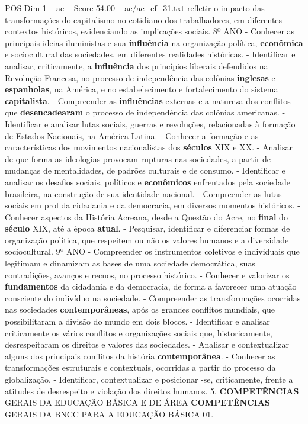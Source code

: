 \begin{textsample}{POS Dim 1 – ac – Score 54.00 – ac/ac\_ef\_31.txt}
refletir o impacto das transformações do capitalismo no cotidiano dos trabalhadores, em diferentes contextos históricos, evidenciando as implicações sociais. 8º ANO - Conhecer as principais ideias iluministas e sua \textbf{influência} na organização política, \textbf{econômica} e sociocultural das sociedades, em diferentes realidades históricas. - Identificar e analisar, criticamente, a \textbf{influência} dos princípios liberais defendidos na Revolução Francesa, no processo de independência das colônias \textbf{inglesas} e \textbf{espanholas}, na América, e no estabelecimento e fortalecimento do sistema \textbf{capitalista}. - Compreender as \textbf{influências} externas e a natureza dos conflitos que \textbf{desencadearam} o processo de independência das colônias americanas. - Identificar e analisar lutas sociais, guerras e revoluções, relacionadas à formação de Estados Nacionais, na América Latina. - Conhecer a formação e as características dos movimentos nacionalistas dos \textbf{séculos} XIX e XX. - Analisar de que forma as ideologias provocam rupturas nas sociedades, a partir de mudanças de mentalidades, de padrões culturais e de consumo. - Identificar e analisar os desafios sociais, políticos e \textbf{econômicos} enfrentados pela sociedade brasileira, na construção de sua identidade nacional. - Compreender as lutas sociais em prol da cidadania e da democracia, em diversos momentos históricos. - Conhecer aspectos da História Acreana, desde a Questão do Acre, no \textbf{final} do \textbf{século} XIX, até a época \textbf{atual}. - Pesquisar, identificar e diferenciar formas de organização política, que respeitem ou não os valores humanos e a diversidade sociocultural. 9º ANO - Compreender os instrumentos coletivos e individuais que legitimam e dinamizam as bases de uma sociedade democrática, suas contradições, avanços e recuos, no processo histórico. - Conhecer e valorizar os \textbf{fundamentos} da cidadania e da democracia, de forma a favorecer uma atuação consciente do indivíduo na sociedade. - Compreender as transformações ocorridas nas sociedades \textbf{contemporâneas}, após os grandes conflitos mundiais, que possibilitaram a divisão do mundo em dois blocos. - Identificar e analisar criticamente os vários conflitos e organizações sociais que, historicamente, desrespeitaram os direitos e valores das sociedades. - Analisar e contextualizar alguns dos principais conflitos da história \textbf{contemporânea}. - Conhecer as transformações estruturais e contextuais, ocorridas a partir do processo da globalização. - Identificar, contextualizar e posicionar -se, criticamente, frente a atitudes de desrespeito e violação dos direitos humanos. 5. \textbf{COMPETÊNCIAS} GERAIS DA EDUCAÇÃO BÁSICA E DE ÁREA \textbf{COMPETÊNCIAS} GERAIS DA BNCC PARA A EDUCAÇÃO BÁSICA 01.

\end{textsample}
